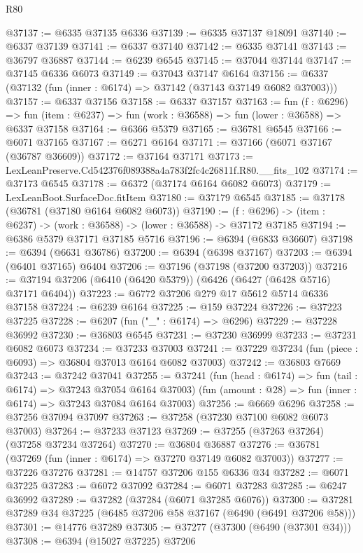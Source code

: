 \begin{lexlean}{R80}
\begin{coremodule}
@37137 := @6335 @37135 @6336
@37139 := @6335 @37137 @18091
@37140 := @6337 @37139
@37141 := @6337 @37140
@37142 := @6335 @37141
@37143 := @36797 @36887
@37144 := @6239 @6545
@37145 := @37044 @37144
@37147 := @37145 @6336 @6073
@37149 := @37043 @37147 @6164
@37156 := @6337 (@37132 (fun (inner : @6174) => @37142 (@37143 @37149 @6082 @37003)))
@37157 := @6337 @37156
@37158 := @6337 @37157
@37163 := fun (f : @6296) =>
  fun (item : @6237) => fun (work : @36588) => fun (lower : @36588) => @6337 @37158
@37164 := @6366 @5379
@37165 := @36781 @6545
@37166 := @6071 @37165
@37167 := @6271 @6164
@37171 := @37166 (@6071 @37167 (@36787 @36609))
@37172 := @37164 @37171
@37173 := LexLeanPreserve.Cd542376f089388a4a783f2fc4c26811f.R80.__fits_102
@37174 := @37173 @6545
@37178 := @6372 (@37174 @6164 @6082 @6073)
@37179 := LexLeanBoot.SurfaceDoc.fitItem
@37180 := @37179 @6545
@37185 := @37178 (@36781 (@37180 @6164 @6082 @6073))
@37190 := (f : @6296) -> (item : @6237) -> (work : @36588) -> (lower : @36588) -> @37172 @37185
@37194 := @6386 @5379 @37171 @37185 @5716
@37196 := @6394 (@6833 @36607)
@37198 := @6394 (@6631 @36786)
@37200 := @6394 (@6398 @37167)
@37203 := @6394 (@6401 @37165) @6404
@37206 := @37196 (@37198 (@37200 @37203))
@37216 := @37194 @37206 (@6410 (@6420 @5379)) (@6426 (@6427 (@6428 @5716) @37171 @6404))
@37223 := @6772 @37206 @279 @17 @5612 @5714 @6336 @37158
@37224 := @6239 @6164
@37225 := @159 @37224
@37226 := @37223 @37225
@37228 := @6207 (fun ("_" : @6174) => @6296)
@37229 := @37228 @36992
@37230 := @36803 @6545
@37231 := @37230 @36999
@37233 := @37231 @6082 @6073
@37234 := @37233 @37003
@37241 := @37229 @37234 (fun (piece : @6093) => @36804 @37013 @6164 @6082 @37003)
@37242 := @36803 @7669
@37243 := @37242 @37041
@37255 := @37241
    (fun (head : @6174) => fun (tail : @6174) => @37243 @37054 @6164 @37003)
    (fun (amount : @28) => fun (inner : @6174) => @37243 @37084 @6164 @37003)
@37256 := @6669 @6296
@37258 := @37256 @37094 @37097
@37263 := @37258 (@37230 @37100 @6082 @6073 @37003)
@37264 := @37233 @37123
@37269 := @37255 (@37263 @37264) (@37258 @37234 @37264)
@37270 := @36804 @36887
@37276 := @36781 (@37269 (fun (inner : @6174) => @37270 @37149 @6082 @37003))
@37277 := @37226 @37276
@37281 := @14757 @37206 @155 @6336 @34
@37282 := @6071 @37225
@37283 := @6072 @37092
@37284 := @6071 @37283
@37285 := @6247 @36992
@37289 := @37282 (@37284 (@6071 @37285 @6076))
@37300 := @37281 @37289 @34 @37225 (@6485 @37206 @58 @37167 (@6490 (@6491 @37206 @58)))
@37301 := @14776 @37289
@37305 := @37277 (@37300 (@6490 (@37301 @34)))
@37308 := @6394 (@15027 @37225) @37206

\end{coremodule}
\end{lexlean}
